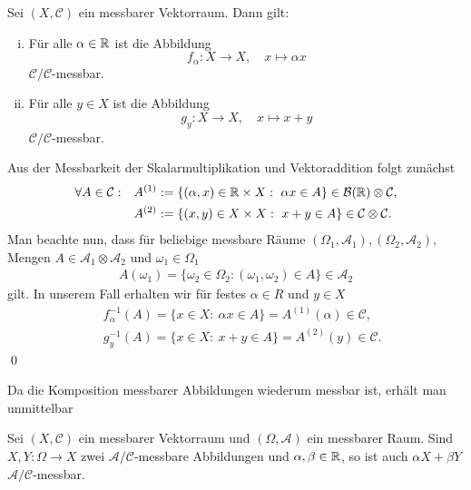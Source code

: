 \begin{remark}
    Sei $(X, \mathcal{C})$ ein messbarer Vektorraum. Dann gilt:
    \begin{enumerate}[(i)]
        \item Für alle $\alpha \in \mathbb{R}$ ist die Abbildung 
            $$f_{\alpha}: X \to X, \quad x \mapsto \alpha x$$
        $\mathcal{C}/\mathcal{C}$-messbar. 
        \item Für alle $y \in X$ ist die Abbildung 
            $$g_y: X \to X, \quad x \mapsto x + y$$
        $\mathcal{C}/\mathcal{C}$-messbar.
    \end{enumerate}
\end{remark}
\begin{proof*}
    Aus der Messbarkeit der Skalarmultiplikation und Vektoraddition  folgt zunächst
    \begin{align*}
        \forall A \in \mathcal{C}: \quad &A^{(1)} := \{(\alpha, x) \in \mathbb{R} \times X: \ \alpha x \in A\} \in \mathcal{B}(\mathbb{R}) \otimes \mathcal{C}, \\\
                                         &A^{(2)} := \{(x,y) \in X \times X: \ x + y \in A\} \in \mathcal{C} \otimes \mathcal{C}. 
    \end{align*}
    Man beachte nun, dass für beliebige  messbare Räume $(\Omega_1, \mathcal{A}_1), (\Omega_2, \mathcal{A}_2)$, Mengen $A \in \mathcal{A}_1 \otimes \mathcal{A}_2$ und $\omega_1 \in \Omega_1$ 
    \begin{align*}
    A(\omega_1) = \{ \omega_2 \in \Omega_2 : (\omega_1,\omega_2) \in A \} \in \mathcal{A}_2
    \end{align*}
    gilt. In unserem Fall erhalten wir für festes $\alpha \in R$ und $y \in X$
    \begin{align*}
        &f_{\alpha}^{-1}(A) = \{x \in X: \ \alpha x \in A\} = A^{(1)}(\alpha) \in \mathcal{C},  \\\
        &g_y^{-1}(A) = \{ x \in X: \ x + y \in A\} = A^{(2)}(y)  \in \mathcal{C}. 
    \end{align*}
    \qed
\end{proof*}
Da die Komposition messbarer Abbildungen wiederum messbar ist, erhält man unmittelbar
\begin{proposition}
    Sei $(X, \mathcal{C})$ ein messbarer Vektorraum und $(\Omega, \mathcal{A})$ ein messbarer Raum. 
    Sind $X,Y: \Omega \to X$ zwei $\mathcal{A}/\mathcal{C}$-messbare Abbildungen und $\alpha, \beta \in \mathbb{R}$, so ist auch $\alpha X + \beta Y$ $\mathcal{A}/\mathcal{C}$-messbar. 
\end{proposition}


